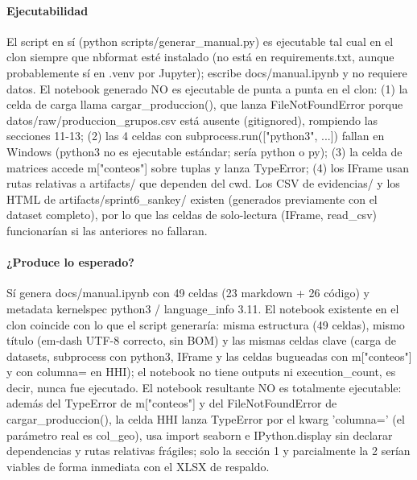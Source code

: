 \paragraph{Ejecutabilidad}
El script en sí (python scripts/generar\_manual.py) es ejecutable tal cual en el clon siempre que nbformat esté instalado (no está en requirements.txt, aunque probablemente sí en .venv por Jupyter); escribe docs/manual.ipynb y no requiere datos. El notebook generado NO es ejecutable de punta a punta en el clon: (1) la celda de carga llama cargar\_produccion(), que lanza FileNotFoundError porque datos/raw/produccion\_grupos.csv está ausente (gitignored), rompiendo las secciones 11-13; (2) las 4 celdas con subprocess.run(["python3", ...]) fallan en Windows (python3 no es ejecutable estándar; sería python o py); (3) la celda de matrices accede m["conteos"] sobre tuplas y lanza TypeError; (4) los IFrame usan rutas relativas a artifacts/ que dependen del cwd. Los CSV de evidencias/ y los HTML de artifacts/sprint6\_sankey/ existen (generados previamente con el dataset completo), por lo que las celdas de solo-lectura (IFrame, read\_csv) funcionarían si las anteriores no fallaran.

\paragraph{¿Produce lo esperado?}
Sí genera docs/manual.ipynb con 49 celdas (23 markdown + 26 código) y metadata kernelspec python3 / language\_info 3.11. El notebook existente en el clon coincide con lo que el script generaría: misma estructura (49 celdas), mismo título (em-dash UTF-8 correcto, sin BOM) y las mismas celdas clave (carga de datasets, subprocess con python3, IFrame y las celdas bugueadas con m["conteos"] y con columna= en HHI); el notebook no tiene outputs ni execution\_count, es decir, nunca fue ejecutado. El notebook resultante NO es totalmente ejecutable: además del TypeError de m["conteos"] y del FileNotFoundError de cargar\_produccion(), la celda HHI lanza TypeError por el kwarg 'columna=' (el parámetro real es col\_geo), usa import seaborn e IPython.display sin declarar dependencias y rutas relativas frágiles; solo la sección 1 y parcialmente la 2 serían viables de forma inmediata con el XLSX de respaldo.

